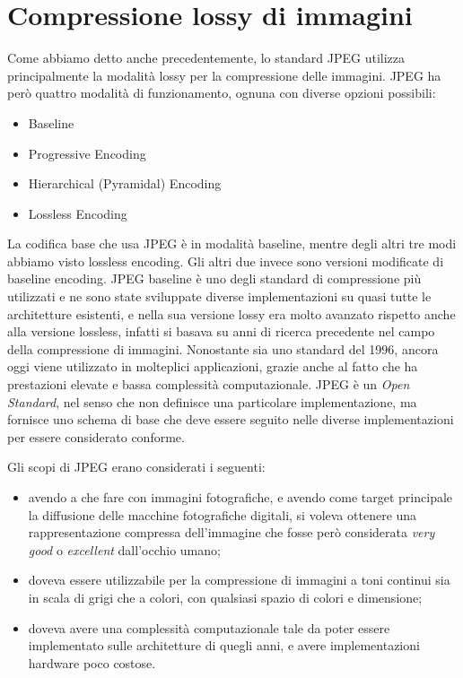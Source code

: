 \chapter{Compressione lossy di immagini}

Come abbiamo detto anche precedentemente, lo standard JPEG utilizza principalmente la modalità lossy per la compressione delle immagini. JPEG ha però quattro modalità di funzionamento, ognuna con diverse opzioni possibili:
\begin{itemize}
    \item Baseline
    \item Progressive Encoding
    \item Hierarchical (Pyramidal) Encoding
    \item Lossless Encoding
\end{itemize}

La codifica base che usa JPEG è in modalità baseline, mentre degli altri tre modi abbiamo visto lossless encoding. Gli altri due invece sono versioni modificate di baseline encoding. JPEG baseline è uno degli standard di compressione più utilizzati e ne sono state sviluppate diverse implementazioni su quasi tutte le architetture esistenti, e nella sua versione lossy era molto avanzato rispetto anche alla versione lossless, infatti si basava su anni di ricerca precedente nel campo della compressione di immagini. Nonostante sia uno standard del 1996, ancora oggi viene utilizzato in molteplici applicazioni, grazie anche al fatto che ha prestazioni elevate e bassa complessità computazionale. JPEG è un \textit{Open Standard}, nel senso che non definisce una particolare implementazione, ma fornisce uno schema di base che deve essere seguito nelle diverse implementazioni per essere considerato conforme. 

Gli scopi di JPEG erano considerati i seguenti:
\begin{itemize}
    \item avendo a che fare con immagini fotografiche, e avendo come target principale la diffusione delle macchine fotografiche digitali, si voleva ottenere una rappresentazione compressa dell'immagine che fosse però considerata \textit{very good} o \textit{excellent} dall'occhio umano;
    \item doveva essere utilizzabile per la compressione di immagini a toni continui sia in scala di grigi che a colori, con qualsiasi spazio di colori e dimensione;
    \item doveva avere una complessità computazionale tale da poter essere implementato sulle architetture di quegli anni, e avere implementazioni hardware poco costose.
\end{itemize}

